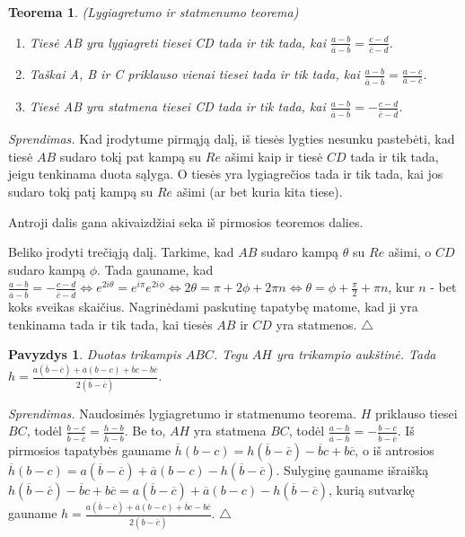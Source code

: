 \documentclass[11pt,a4paper,twoside]{book}
\newenvironment{sprendimas}{\noindent \textit{Sprendimas.}}{\hfill $\triangle$}
\newcounter{foo}[subsection]
\newtheorem{thmnr}{Teorema}
\newtheorem{pavnr}[foo]{Pavyzdys}
\theoremstyle{definition} \newtheorem*{api}{Apibrėžimas}
\theoremstyle{remark} \newtheorem*{pastaba}{Pastaba}
\begin{document}
\begin{thmnr}\textit{(Lygiagretumo ir statmenumo teorema)}\
\begin{enumerate}
\item Tiesė AB yra lygiagreti tiesei CD tada ir tik tada, kai $\frac{a - b}{\overline{a} -\overline{b}}=\frac{c - d}{\overline{c} - \overline{d}}$.
\item Taškai A, B ir C priklauso vienai tiesei tada ir tik tada, kai $\frac{a - b}{\overline{a} -\overline{b}}=\frac{a-c}{\overline{a} - \overline{c}}$.
\item Tiesė AB yra statmena tiesei CD tada ir tik tada, kai $\frac{a - b}{\overline{a} -\overline{b}}=-\frac{c - d}{\overline{c} - \overline{d}}$.
\end{enumerate}
\end{thmnr}
\begin{sprendimas} Kad įrodytume pirmąją dalį, iš tiesės lygties nesunku pastebėti, kad tiesė $AB$ sudaro tokį pat kampą su $Re$ ašimi kaip ir tiesė $CD$ tada ir tik tada, jeigu tenkinama duota sąlyga. O tiesės yra lygiagrečios tada ir tik tada, kai jos sudaro tokį patį kampą su $Re$ ašimi (ar bet kuria kita tiese).

Antroji dalis gana akivaizdžiai seka iš pirmosios teoremos dalies.

Beliko įrodyti trečiąją dalį. Tarkime, kad $AB$ sudaro kampą $\theta$ su $Re$ ašimi, o $CD$ sudaro kampą $\phi$. Tada gauname, kad $\frac{a - b}{\overline{a} -\overline{b}}=-\frac{c - d}{\overline{c} - \overline{d}} \Leftrightarrow e^{2i\theta}=e^{i\pi}e^{2i\phi} \Leftrightarrow 2\theta = \pi + 2\phi + 2\pi n \Leftrightarrow \theta = \phi + \frac{\pi}{2} + \pi n $, kur $n$ - bet koks sveikas skaičius. Nagrinėdami paskutinę tapatybę matome, kad ji yra tenkinama tada ir tik tada, kai tiesės $AB$ ir $CD$ yra statmenos.
\end{sprendimas}

\begin{pavnr}
Duotas trikampis $ABC$. Tegu $AH$ yra trikampio aukštinė. Tada $h=\frac{a(\overline{b}-\overline{c})+\overline{a}(b-c)+\overline{b}c-b\overline{c}}{2(\overline{b}-\overline{c})}.$
\end{pavnr}
\begin{sprendimas}
Naudosimės lygiagretumo ir statmenumo teorema. $H$ priklauso tiesei $BC$, todėl $\frac{b - c}{\overline{b} -\overline{c}}=\frac{h-b}{\overline{h} - \overline{b}}$. Be to, $AH$ yra statmena $BC$, todėl $\frac{a - h}{\overline{a} -\overline{h}}=-\frac{b - c}{\overline{b} - \overline{c}}$. Iš pirmosios tapatybės gauname $\overline{h}(b-c)=h(\overline{b} - \overline{c}) - \overline{b}c+b\overline{c}$, o iš antrosios $\overline{h}(b-c)=a(\overline{b}-\overline{c})+\overline{a}(b-c)-h(\overline{b}-\overline{c})$. Sulyginę gauname išraišką $h(\overline{b} - \overline{c}) - \overline{b}c+b\overline{c}=a(\overline{b}-\overline{c})+\overline{a}(b-c)-h(\overline{b}-\overline{c})$, kurią sutvarkę gauname $h=\frac{a(\overline{b}-\overline{c})+\overline{a}(b-c)+\overline{b}c-b\overline{c}}{2(\overline{b}-\overline{c})}$.
\end{sprendimas}
\end{document}
